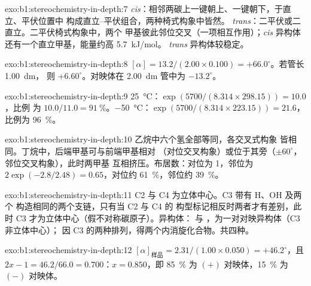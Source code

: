 \begin{solution}{exo:b1:stereochemistry-in-depth:7}
\textit{cis}：相邻两碳上一键朝上、一键朝下，于直立、平伏位置中
构成直立–平伏组合，两种椅式构象中皆然。
\textit{trans}：二平伏或二直立。二平伏椅式构象中，两个
甲基彼此邻位交叉（一项相互作用）；\textit{cis}
异构体还有一个直立甲基，能量约高 \qty{5.7}{kJ/mol}。
\textit{trans} 异构体较稳定。
\end{solution}

\begin{solution}{exo:b1:stereochemistry-in-depth:8}
$[\alpha] = 13.2/(2.00 \times 0.100) = +66.0^\circ$。若管长 \qty{1.00}{dm}，
则 $+6.60^\circ$。对映体在 \qty{2.00}{dm} 管中为 $-13.2^\circ$。
\end{solution}

\begin{solution}{exo:b1:stereochemistry-in-depth:9}
\qty{25}{\celsius}：$\exp(5700/(8.314 \times 298.15)) = 10.0$，比例
为 $10.0/11.0 = \qty{91}{\percent}$。\qty{-50}{\celsius}：$\exp(5700/(8.314
\times 223.15)) = 21.6$，比例为 \qty{96}{\percent}。
\end{solution}

\begin{solution}{exo:b1:stereochemistry-in-depth:10}
乙烷中六个氢全部等同，各交叉式构象
皆相同。丁烷中，后端甲基可与前端甲基相对
（对位交叉构象）或位于其旁（$\pm 60^\circ$，邻位交叉构象），此时两甲基
互相挤压。布居数：对位为 1，邻位为 $2\exp(-2.8/2.48) = 0.65$，对位约
\qty{61}{\percent}，邻位约 \qty{39}{\percent}。
\end{solution}

\begin{solution}{exo:b1:stereochemistry-in-depth:11}
C2 与 C4 为立体中心。C3 带有 H、OH 及两个
构造相同的两个支链，只有当 C2 与 C4 的
构型标记相反时两者才有差别，此时 C3 才为立体中心（假不对称碳原子）。异构体：
 与 ，为一对对映异构体（C3 非立体中心）；
 因 C3 的两种排列，得两个内消旋化合物。共四种。
\end{solution}

\begin{solution}{exo:b1:stereochemistry-in-depth:12}
$[\alpha]_{\text{样品}} = 2.31/(1.00 \times 0.050) = +46.2^\circ$，且
$2x - 1 = 46.2/66.0 = 0.700$：$x = 0.850$，即 \qty{85}{\percent} 为
$(+)$ 对映体，\qty{15}{\percent} 为 $(-)$ 对映体。
\end{solution}

